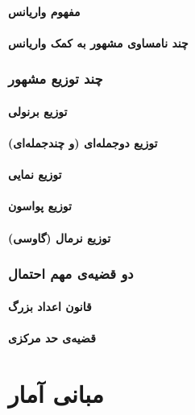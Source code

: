 \documentclass{article}
\begin{document}
\subsection{مفهوم واریانس}
\subsection{چند نامساوی مشهور به کمک واریانس}


\section{چند توزیع مشهور}
\subsection{توزیع برنولی}
\subsection{توزیع دوجمله‌ای (و چندجمله‌ای)}
\subsection{توزیع نمایی}
\subsection{توزیع پواسون}
\subsection{توزیع نرمال (گاوسی)}


\section{دو قضیه‌ی مهم احتمال}
\subsection{قانون اعداد بزرگ}
\subsection{قضیه‌ی حد مرکزی}


\part{مبانی آمار}
\end{document}
